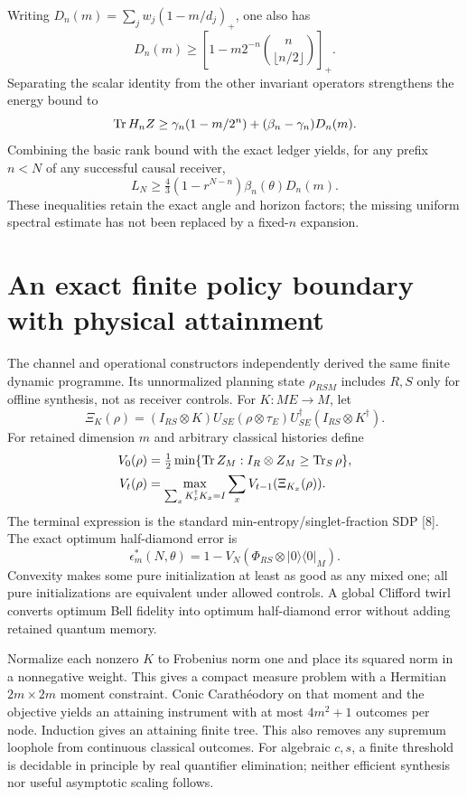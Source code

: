 Writing $D_n(m)=\sum_jw_j(1-m/d_j)_+$, one also has
\[
 D_n(m)\ge\left[1-m2^{-n}\binom n{\lfloor n/2\rfloor}\right]_+.
\]
Separating the scalar identity from the other invariant operators strengthens
the energy bound to
\[
 \operatorname{Tr} H_nZ\ge\gamma_n(1-m/2^n)+(\beta_n-\gamma_n)D_n(m).
\]
Combining the basic rank bound with the exact ledger yields, for any prefix
$n<N$ of any successful causal receiver,
\[
 L_N\ge\tfrac43(1-r^{N-n})\beta_n(\theta)D_n(m).
\]
These inequalities retain the exact angle and horizon factors; the missing
uniform spectral estimate has not been replaced by a fixed-$n$ expansion.







\section{An exact finite policy boundary with physical attainment}
The channel and operational constructors independently derived the same
finite dynamic programme. Its unnormalized planning state $\rho_{RSM}$
includes $R,S$ only for offline synthesis, not as receiver controls. For
$K:ME\to M$, let
\[
 \Xi_K(\rho)=(I_{RS}\otimes K)U_{SE}(\rho\otimes\tau_E)
 U_{SE}^\dagger(I_{RS}\otimes K^\dagger).
\]
For retained dimension $m$ and arbitrary classical histories define
\begin{align}
 V_0(\rho)&=\tfrac12\min\{\operatorname{Tr} Z_M:I_R\otimes Z_M\ge\operatorname{Tr}_S\rho\},\\
 V_t(\rho)&=\max_{\sum_xK_x^\dagger K_x=I}\sum_xV_{t-1}(\Xi_{K_x}(\rho)).
\end{align}
The terminal expression is the standard min-entropy/singlet-fraction SDP [8].
The exact optimum half-diamond error is
\[
 \epsilon_m^*(N,\theta)=1-V_N(\Phi_{RS}\otimes|0\rangle\langle0|_M).
\]
Convexity makes some pure initialization at least as good as any mixed one;
all pure initializations are equivalent under allowed controls. A global
Clifford twirl converts optimum Bell fidelity into optimum half-diamond
error without adding retained quantum memory.

Normalize each nonzero $K$ to Frobenius norm one and place its squared norm
in a nonnegative weight. This gives a compact measure problem with a
Hermitian $2m\times2m$ moment constraint. Conic Carath\'eodory on that moment
and the objective yields an attaining instrument with at most $4m^2+1$
outcomes per node. Induction gives an attaining finite tree. This also removes
any supremum loophole from continuous classical outcomes. For algebraic
$c,s$, a finite threshold is decidable in principle by real quantifier
elimination; neither efficient synthesis nor useful asymptotic scaling follows.

